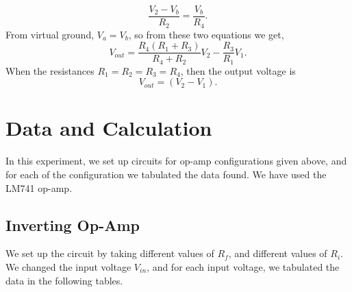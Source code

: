 \documentclass[12pt]{article}
\begin{document}
\begin{equation*}
	\frac{V_2 - V_b}{R_2} = \frac{V_b}{R_4}.
\end{equation*}
From virtual ground, $ V_a = V_b $, so from these two equations we get, 
\begin{equation*}
	V_{out} = \frac{R_4(R_1 + R_3)}{R_4 + R_2}V_2 - \frac{R_3}{R_1}V_1.
\end{equation*} 
When the resistances $ R_1 = R_2 = R_3 = R_4 $, then the output voltage is 
\begin{equation*}
	V_{out} = (V_2 - V_1).
\end{equation*}
\section{Data and Calculation}
In this experiment, we set up circuits for op-amp configurations given above, and for each of the configuration we tabulated the data found. We have used the LM741 op-amp.
\subsection{Inverting Op-Amp}
We set up the circuit by taking different values of $ R_f $, and different values of $ R_i $.
 We changed the input voltage $ V_{in} $, and for each input voltage, we tabulated the data in the following tables.  
\end{document}
